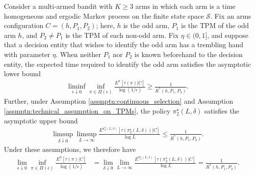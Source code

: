 \begin{theorem}\label{prop:main_result}
	Consider a multi-armed bandit with $K\geq 3$ arms in which each arm is a time homogeneous and ergodic Markov process on the finite state space $\mathcal{S}$. Fix an arms configuration $C=(h, P_1, P_2)$; here, $h$ is the odd arm, $P_1$ is the TPM of the odd arm $h$, and $P_2\neq P_1$ is the TPM of each non-odd arm. Fix $\eta\in (0,1]$, and suppose that a decision entity that wishes to identify the odd arm has a trembling hand with parameter $\eta$. When neither $P_1$ nor $P_2$ is known beforehand to the decision entity, the expected time required to identify the odd arm satisfies the asymptotic lower bound
	\begin{align}
		\liminf\limits_{\epsilon\downarrow 0}\inf\limits_{\pi\in\Pi(\epsilon)}\frac{E^\pi[\tau(\pi)|C]}{\log(1/\epsilon)}\geq \frac{1}{R^*(h, P_1, P_2)}.\label{eq:lower_bound_main_result}
	\end{align}
	Further, under Assumption \ref{assmptn:continuous_selection} and Assumption \ref{assmptn:technical_assumption_on_TPMs}, the policy $\pi_2^\star(L, \delta)$ satisfies the asymptotic upper bound
	\begin{align}		\limsup\limits_{\delta\downarrow 0} \limsup\limits_{L\to\infty}\frac{E^{\pi_2^\star(L, \delta)}[\tau(\pi_2^\star(L, \delta))|C]}{\log L}\leq \frac{1}{R^*(h, P_1, P_2)}.\label{eq:upper_bound_main_result}
	\end{align}
	Under these assumptions, we therefore have
		\begin{align}
		\lim\limits_{\epsilon\downarrow 0}\inf\limits_{\pi\in\Pi(\epsilon)}\frac{E^\pi[\tau(\pi)|C]}{\log(1/\epsilon)}&=\lim\limits_{\delta \downarrow 0}\lim\limits_{L\to\infty}\frac{E^{\pi_2^\star(L, \delta)}[\tau(\pi_2^\star(L,\delta))|C]}{\log L}=\frac{1}{R^*(h, P_1, P_2)}.\label{eq:main_result}
	\end{align}
\end{theorem}

